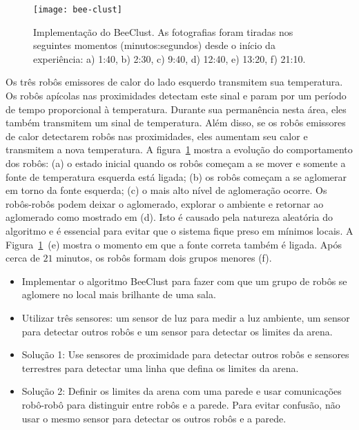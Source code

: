 \begin{figure}
\begin{center}
\texttt{[image: bee-clust]}
\end{center}
\caption{Implementação do BeeClust. As fotografias foram tiradas nos seguintes momentos (minutos:segundos) desde o início da experiência: a) 1:40, b) 2:30, c) 9:40, d) 12:40, e) 13:20, f) 21:10.}\label{fig.beeclust-demo}
\end{figure}

Os três robôs emissores de calor do lado esquerdo transmitem sua temperatura. Os robôs apícolas nas proximidades detectam este sinal e param por um período de tempo proporcional à temperatura. Durante sua permanência nesta área, eles também transmitem um sinal de temperatura. Além disso, se os robôs emissores de calor detectarem robôs nas proximidades, eles aumentam seu calor e transmitem a nova temperatura. A figura~\ref{fig.beeclust-demo} mostra a evolução do comportamento dos robôs: (a) o estado inicial quando os robôs começam a se mover e somente a fonte de temperatura esquerda está ligada; (b) os robôs começam a se aglomerar em torno da fonte esquerda; (c) o mais alto nível de aglomeração ocorre. Os robôs-robôs podem deixar o aglomerado, explorar o ambiente e retornar ao aglomerado como mostrado em (d). Isto é causado pela natureza aleatória do algoritmo e é essencial para evitar que o sistema fique preso em mínimos locais. A Figura~\ref{fig.beeclust-demo}~(e) mostra o momento em que a fonte correta também é ligada. Após cerca de $21$ minutos, os robôs formam dois grupos menores (f).

\begin{framed}
\begin{itemize}
\item Implementar o algoritmo BeeClust para fazer com que um grupo de robôs se aglomere no local mais brilhante de uma sala.
\item Utilizar três sensores: um sensor de luz para medir a luz ambiente, um sensor para detectar outros robôs e um sensor para detectar os limites da arena.
\item Solução 1: Use sensores de proximidade para detectar outros robôs e sensores terrestres para detectar uma linha que defina os limites da arena.
\item Solução 2: Definir os limites da arena com uma parede e usar comunicações robô-robô para distinguir entre robôs e a parede. Para evitar confusão, não usar o mesmo sensor para detectar os outros robôs e a parede.
\end{itemize}
\end{framed}

